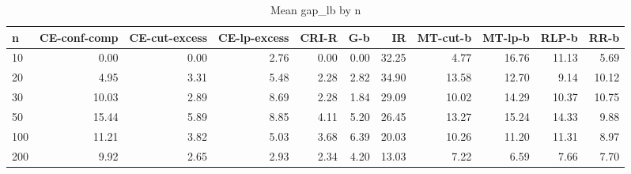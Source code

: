 \begin{table}[htbp]
\centering
\small
\caption{Mean gap\_lb by n}
\label{tab:E2b_head_to_head_budgets_b1_by_n}
\begin{tabular}{lrrrrrrrrrr}
\toprule
n & CE-conf-comp & CE-cut-excess & CE-lp-excess & CRI-R & G-b & IR & MT-cut-b & MT-lp-b & RLP-b & RR-b \\
\midrule
10 & 0.00 & 0.00 & 2.76 & 0.00 & 0.00 & 32.25 & 4.77 & 16.76 & 11.13 & 5.69 \\
20 & 4.95 & 3.31 & 5.48 & 2.28 & 2.82 & 34.90 & 13.58 & 12.70 & 9.14 & 10.12 \\
30 & 10.03 & 2.89 & 8.69 & 2.28 & 1.84 & 29.09 & 10.02 & 14.29 & 10.37 & 10.75 \\
50 & 15.44 & 5.89 & 8.85 & 4.11 & 5.20 & 26.45 & 13.27 & 15.24 & 14.33 & 9.88 \\
100 & 11.21 & 3.82 & 5.03 & 3.68 & 6.39 & 20.03 & 10.26 & 11.20 & 11.31 & 8.97 \\
200 & 9.92 & 2.65 & 2.93 & 2.34 & 4.20 & 13.03 & 7.22 & 6.59 & 7.66 & 7.70 \\
\bottomrule
\end{tabular}
\end{table}
